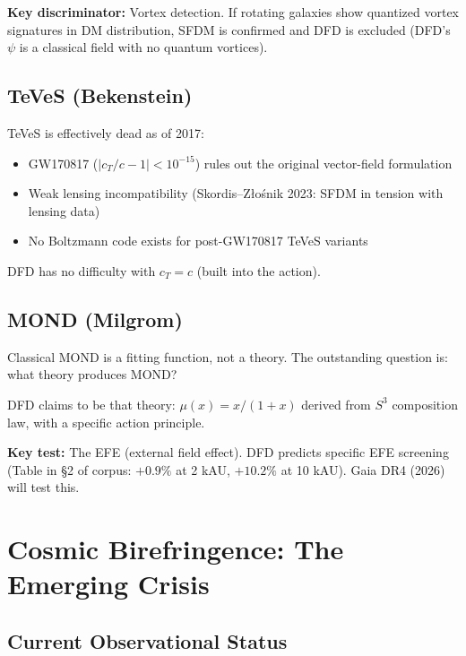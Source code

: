 \documentclass[11pt]{article}
\begin{document}
\textbf{Key discriminator:} Vortex detection.  If rotating galaxies
show quantized vortex signatures in DM distribution, SFDM is
confirmed and DFD is excluded (DFD's $\psi$ is a classical field
with no quantum vortices).

\subsection{TeVeS (Bekenstein)}

TeVeS is effectively dead as of 2017:
\begin{itemize}
\item GW170817 ($|c_T/c - 1| < 10^{-15}$) rules out the
  original vector-field formulation
\item Weak lensing incompatibility (Skordis--Z{\l}o\'{s}nik
  2023: SFDM in tension with lensing data)
\item No Boltzmann code exists for post-GW170817 TeVeS variants
\end{itemize}

DFD has no difficulty with $c_T = c$ (built into the action).

\subsection{MOND (Milgrom)}

Classical MOND is a fitting function, not a theory.  The
outstanding question is: what theory produces MOND?

DFD claims to be that theory: $\mu(x) = x/(1+x)$ derived from
$S^3$ composition law, with a specific action principle.

\textbf{Key test:} The EFE (external field effect).  DFD
predicts specific EFE screening (Table in \S2 of corpus:
$+0.9\%$ at 2 kAU, $+10.2\%$ at 10 kAU).  Gaia DR4 (2026)
will test this.


\section{Cosmic Birefringence: The Emerging Crisis}
\label{sec:crisis}

\subsection{Current Observational Status}
\end{document}
